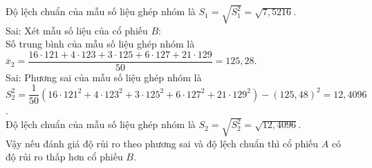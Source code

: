 \begin{ex}
{\begin{itemchoice}
			Độ lệch chuẩn của mẫu số liệu ghép nhóm  là $S_1=\sqrt{S_1^2}=\sqrt{7{,}5216}$.\\
			\itemch  Sai: Xét mẫu số liệu của cổ phiếu $B$:\\
			Số trung bình của  mẫu số liệu ghép nhóm là\\
			$\overline{x}_2=\dfrac{16\cdot 121+4\cdot 123+3\cdot 125+6\cdot 127+21\cdot  129}{50}=125{,}28.$\\
			 \itemch Sai: Phương sai của mẫu số liệu ghép nhóm là\\
			$S_2^2=\dfrac{1}{50}(16\cdot 121^2+4\cdot 123^2+3\cdot 125^2+6\cdot 127^2+21\cdot  129^2)-{{(125{,}48)}^2}=12{,}4096$.\\
			Độ lệch chuẩn của mẫu số liệu ghép nhóm là $S_2=\sqrt{S_2^2}=\sqrt{12{,}4096}$.\\ 
			\itemch Vậy nếu đánh giá độ rủi ro theo phương sai và độ lệch chuẩn thì  cổ phiếu $A$ có độ rủi ro thấp hơn cổ phiếu $B$.
		\end{itemchoice}
	 }
\end{ex}

